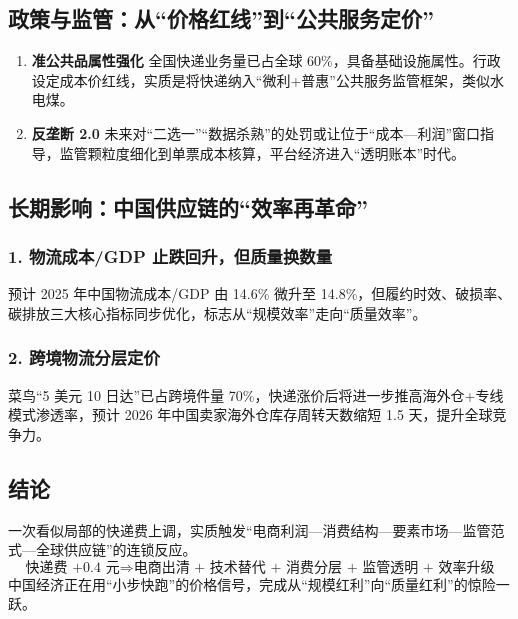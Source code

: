 \subsection{政策与监管：从“价格红线”到“公共服务定价”}
\begin{enumerate}[leftmargin=*,nosep]
    \item \textbf{准公共品属性强化}  
    全国快递业务量已占全球 60\%，具备基础设施属性。行政设定成本价红线，实质是将快递纳入“微利+普惠”公共服务监管框架，类似水电煤。
    
    \item \textbf{反垄断 2.0}  
    未来对“二选一”“数据杀熟”的处罚或让位于“成本—利润”窗口指导，监管颗粒度细化到单票成本核算，平台经济进入“透明账本”时代。
\end{enumerate}

\subsection{长期影响：中国供应链的“效率再革命”}
\subsubsection{1. 物流成本/GDP 止跌回升，但质量换数量}
预计 2025 年中国物流成本/GDP 由 14.6\% 微升至 14.8\%，但履约时效、破损率、碳排放三大核心指标同步优化，标志从“规模效率”走向“质量效率”。

\subsubsection{2. 跨境物流分层定价}
菜鸟“5 美元 10 日达”已占跨境件量 70\%，快递涨价后将进一步推高海外仓+专线模式渗透率，预计 2026 年中国卖家海外仓库存周转天数缩短 1.5 天，提升全球竞争力。

\subsection*{结论}
一次看似局部的快递费上调，实质触发“电商利润—消费结构—要素市场—监管范式—全球供应链”的连锁反应。  
\[
\text{快递费 +0.4 元} \Rightarrow \text{电商出清 + 技术替代 + 消费分层 + 监管透明 + 效率升级}
\]
中国经济正在用“小步快跑”的价格信号，完成从“规模红利”向“质量红利”的惊险一跃。


